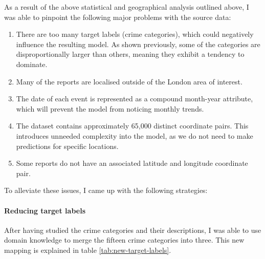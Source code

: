 \documentclass{article}
\begin{document}
	As a result of the above statistical and geographical analysis outlined above, I was able to pinpoint the following major problems with the source data:

	\begin{enumerate}
		\item There are too many target labels (crime categories), which could negatively influence the resulting model. As shown previously, some of the categories are disproportionally larger than others, meaning they exhibit a tendency to dominate.
		\item Many of the reports are localised outside of the London area of interest.
		\item The date of each event is represented as a compound month-year attribute, which will prevent the model from noticing monthly trends.
		\item The dataset contains approximately 65,000 distinct coordinate pairs. This introduces unneeded complexity into the model, as we do not need to make predictions for specific locations.
		\item Some reports do not have an associated latitude and longitude coordinate pair.
	\end{enumerate}

	To alleviate these issues, I came up with the following strategies:

	\paragraph{Reducing target labels}

	After having studied the crime categories and their descriptions, I was able to use domain knowledge to merge the fifteen crime categories into three. This new mapping is explained in table \ref{tab:new-target-labels}.
\end{document}

